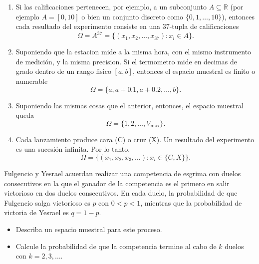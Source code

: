 \documentclass[12pt,a4paper]{article}
\begin{document}
    \begin{solucion}
        \begin{enumerate}
            \item[(a)] Si las calificaciones pertenecen, por ejemplo, a un subconjunto $A\subseteq\mathbb{R}$
            (por ejemplo $A=[0,10]$ o bien un conjunto discreto como $\{0,1,\dots,10\}$), entonces
            cada resultado del experimento consiste en una 37-tupla de calificaciones
            \begin{equation*}
                \Omega=A^{37}=\{(x_{1},x_{2},\dots,x_{37}):x_{i}\in A\}.
            \end{equation*}
            \item[(b)] Suponiendo que la estacion mide a la misma hora, con el mismo instrumento de medición,
            y la misma precision. Si el termometro mide en decimas de grado dentro de un rango fisico $[a,b]$,
            entonces el espacio muestral es finito o numerable
            \begin{equation*}
                \Omega=\{a,a+0.1,a+0.2,\dots,b\}.
            \end{equation*}
            \item[(c)] Suponiendo las mismas cosas que el anterior, entonces, el espacio muestral queda
            \begin{equation*}
                \Omega=\{1,2,\dots,V_{\text{max}}\}.
            \end{equation*}
            \item[(d)] Cada lanzamiento produce cara (C) o cruz (X). Un resultado del experimento es una
            sucesión infinita. Por lo tanto,
            \begin{equation*}
                \Omega=\{(x_{1},x_{2},x_{3},\dots):x_{i}\in\{C,X\}\}.
            \end{equation*}
        \end{enumerate}
    \end{solucion}

    \begin{mdframed}[style=mdbluebox,frametitle={Ejercicio 4}]
        Fulgencio y Yesrael acuerdan realizar una competencia de esgrima con duelos consecutivos
        en la que el ganador de la competencia es el primero en salir victorioso en dos duelos consecutivos.
        En cada duelo, la probabilidad de que Fulgencio salga victorioso es $p$ con $0<p<1$, mientras que la
        probabilidad de victoria de Yesrael es $q = 1-p$.
        \begin{itemize}
            \item[(a)] Describa un espacio muestral para este proceso.
            \item[(b)] Calcule la probabilidad de que la competencia termine al cabo de $k$ duelos con $k=2,3,\dots$.
        \end{itemize}
    \end{mdframed}
\end{document}
